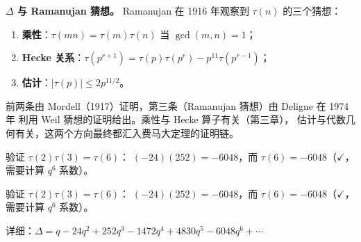 \textbf{$\Delta$ 与 Ramanujan 猜想。}
Ramanujan 在 1916 年观察到 $\tau(n)$ 的三个猜想：
\begin{enumerate}
  \item \textbf{乘性}：$\tau(mn) = \tau(m)\tau(n)$ 当 $\gcd(m,n) = 1$；
  \item \textbf{Hecke 关系}：$\tau(p^{r+1}) = \tau(p)\tau(p^r) - p^{11}\tau(p^{r-1})$；
  \item \textbf{估计}：$|\tau(p)| \leq 2p^{11/2}$。
\end{enumerate}
前两条由 Mordell（1917）证明，第三条（Ramanujan 猜想）由 Deligne 在 1974 年
利用 Weil 猜想的证明给出。乘性与 Hecke 算子有关（第三章），
估计与代数几何有关，这两个方向最终都汇入费马大定理的证明链。

\begin{example}
\label{ex:tau-multiplicative}
验证 $\tau(2)\tau(3) = \tau(6)$：
$(-24)(252) = -6048$，而 $\tau(6) = -6048$（$\checkmark$，需要计算 $q^6$ 系数）。

验证 $\tau(2)\tau(3) = \tau(6)$：
$(-24)(252) = -6048$，而 $\tau(6) = -6048$（$\checkmark$，需要计算 $q^6$ 系数）。

详细：$\Delta = q - 24q^2 + 252q^3 - 1472q^4 + 4830q^5 - 6048q^6 + \cdots$
\end{example}


